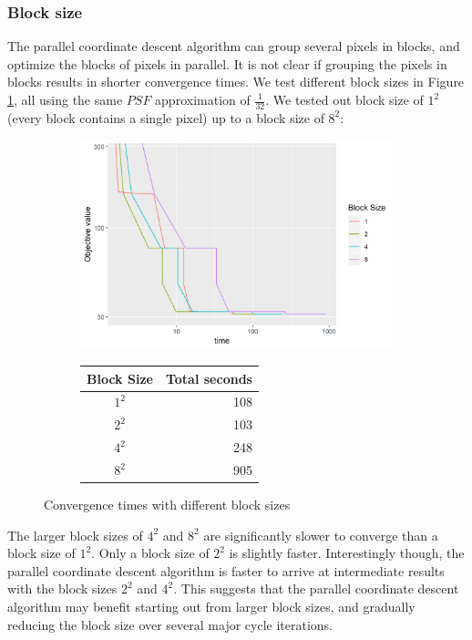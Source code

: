 \subsubsection{Block size}
The parallel coordinate descent algorithm can group several pixels in blocks, and optimize the blocks of pixels in parallel. It is not clear if grouping the pixels in blocks results in shorter convergence times. We test different block sizes in Figure \ref{pcdm:results:block}, all using the same $PSF$ approximation of $\frac{1}{32}$. We tested out block size of $1^2$ (every block contains a single pixel) up to a block size of $8^2$:

\begin{figure}[h]
	\centering
	\begin{subfigure}{0.6\linewidth}
		\includegraphics[width=1.0\linewidth]{./chapters/05.pcdm/parameters/blockSize.png}
	\end{subfigure}
	\begin{subfigure}{0.35\linewidth}
		\begin{tabular}{c | r}
			Block Size & Total seconds \\ \hline
			$1^2$ & 108 \\
			$2^2$ & 103 \\
			$4^2$ & 248 \\
			$8^2$ & 905 \\
		\end{tabular}
	\end{subfigure}
	\caption{Convergence times with different block sizes}
	\label{pcdm:results:block}
\end{figure}

The larger block sizes of $4^2$ and $8^2$ are significantly slower to converge than a block size of $1^2$. Only a block size of $2^2$ is slightly faster. Interestingly though, the parallel coordinate descent algorithm is faster to arrive at intermediate results with the block sizes $2^2$ and $4^2$. This suggests that the parallel coordinate descent algorithm may benefit starting out from larger block sizes, and gradually reducing the block size over several major cycle iterations.


